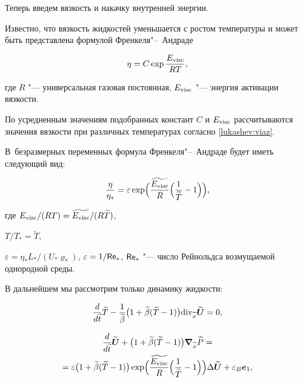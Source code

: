 Теперь введем вязкость и накачку внутренней энергии.

Известно, что вязкость жидкостей уменьшается с ростом температуры и может быть представлена формулой Френкеля"--~Андраде

\begin{gather}

\eta=C \exp {\frac{E_{\rm visc}}{RT}},

\label{lukashev:viaz}

\end{gather}

где $R$ "--- универсальная газовая постоянная, $E_{\rm visc}$ "--- энергия активации вязкости.

По усредненным значениям подобранных констант $C$ и $E_{\rm visc}$ рассчитываются значения вязкости при различных температурах согласно \eqref{lukashev:viaz}. 

В~безразмерных переменных формула Френкеля"--~Андраде будет иметь следующий вид:

\begin{gather}

\frac {\eta}{\eta_*}={\varepsilon} \exp

\Bigl(\frac{\widetilde{E_{\rm visc}}}{R}\Bigl(\frac1{\widetilde{T}}-1\Bigr)\Bigr),

\label{lukashev:viazBezr}

\end{gather}

где $E_{\rm visc}/(RT)=\widetilde{E_{\rm visc}}/(R\widetilde{T})$, 

$T/T_*=\widetilde{T}$,

${\varepsilon}=\eta_*L_*/(U_*\varrho_*)$, ${\varepsilon}=1/{\sf Re}_*$, ${\sf Re}_*$ "--- число Рейнольдса возмущаемой однородной среды.

В дальнейшем мы рассмотрим только динамику жидкости:

$$

\frac{d}{d\widetilde{t}} \widetilde{T}-\frac1{\widetilde{\beta}}\big(1+\widetilde{\beta}(\widetilde{T}-1)\big) {\mathop{\rm div}\nolimits}_{\widetilde{x}} \widetilde{\boldsymbol U}=0,

$$


\begin{multline}

\frac{d}{d\widetilde{t}} \widetilde{\boldsymbol U}+

\bigl(1+\widetilde{\beta}(\widetilde{T}-1)\bigr) \boldsymbol \nabla_{\widetilde{x}} \widetilde{P}=

\\

=

{\varepsilon} \bigl(1+\widetilde{\beta}(\widetilde{T}-1)\bigr) 

\exp\Bigl(\frac{\widetilde{E_{\rm visc}}}{R}\Bigl(\frac1{\widetilde{T}}-1\Bigr)\Bigr) \Delta \widetilde{\boldsymbol  U} +{\varepsilon}_B \boldsymbol e_1,

\end{multline}

